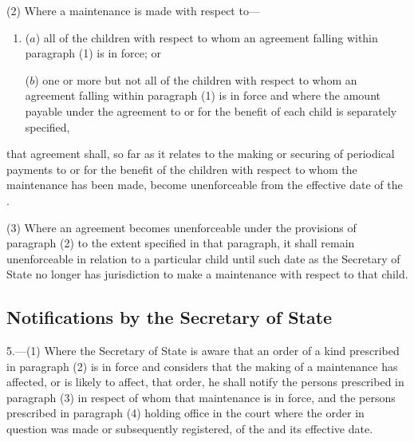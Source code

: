 \documentclass[12pt,a4paper]{article}
\begin{document}
(2) Where a maintenance  is made with respect to—
\begin{enumerate}\item[]
($a$) all of the children with respect to whom an agreement falling within paragraph (1) is in force; or

($b$) one or more but not all of the children with respect to whom an agreement falling within paragraph (1) is in force and where the amount payable under the agreement to or for the benefit of each child is separately specified,
\end{enumerate}
that agreement shall, so far as it relates to the making or securing of periodical payments to or for the benefit of the children with respect to whom the maintenance  has been made, become unenforceable from the effective date of the .

(3) Where an agreement becomes unenforceable under the provisions of paragraph (2) to the extent specified in that paragraph, it shall remain unenforceable in relation to a particular child until such date as 
the Secretary of State  %
no longer has jurisdiction to make a maintenance  with respect to that child.



\subsection[5. Notifications by the Secretary of State]{Notifications by the Secretary of State}

5.—(1) Where 
the Secretary of State  %
is aware that an order of a kind prescribed in paragraph (2) is in force and considers that the making of a maintenance  has affected, or is likely to affect, that order, he shall notify the persons prescribed in paragraph (3) in respect of whom that maintenance  is in force, and the persons prescribed in paragraph (4) holding office in the court where the order in question was made or subsequently registered, of the  and its effective date.
\end{document}

